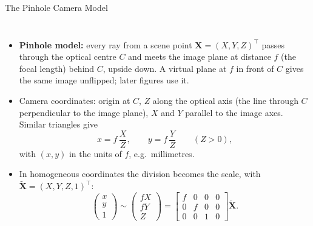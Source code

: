 \begin{frame}{The Pinhole Camera Model}
  \begin{columns}[T,onlytextwidth]
      \begin{itemize}\footnotesize\itemsep0.3em
        \item \textbf{Pinhole model:} every ray from a scene point $\mathbf{X}=(X,Y,Z)^\top$ passes through the optical centre $C$ and meets the image plane at distance $f$ (the focal length) behind $C$, upside down. A virtual plane at $f$ in front of $C$ gives the same image unflipped; later figures use it.
        \item Camera coordinates: origin at $C$, $Z$ along the optical axis (the line through $C$ perpendicular to the image plane), $X$ and $Y$ parallel to the image axes. Similar triangles give
        \[ x = f\,\frac{X}{Z},\qquad y = f\,\frac{Y}{Z}\qquad (Z>0), \]
        with $(x,y)$ in the units of $f$, e.g.\ millimetres.
        \item In homogeneous coordinates the division becomes the scale, with $\tilde{\mathbf{X}}=(X,Y,Z,1)^\top$:
        \[ \begin{pmatrix} x\\ y\\ 1\end{pmatrix} \sim \begin{pmatrix} fX\\ fY\\ Z\end{pmatrix} = \begin{bmatrix} f&0&0&0\\ 0&f&0&0\\ 0&0&1&0\end{bmatrix}\tilde{\mathbf{X}}. \]
      \end{itemize}
      \centering
      \vspace{0.6em}
\end{columns}
\end{frame}
